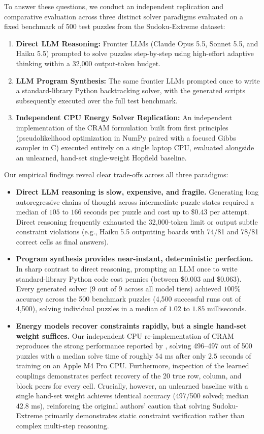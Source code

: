 \documentclass{article} %
\begin{document}
To answer these questions, we conduct an independent replication and comparative evaluation across three distinct solver paradigms evaluated on a fixed benchmark of 500 test puzzles from the Sudoku-Extreme dataset:
\begin{enumerate}
    \item \textbf{Direct LLM Reasoning:} Frontier LLMs (Claude Opus 5.5, Sonnet 5.5, and Haiku 5.5) prompted to solve puzzles step-by-step using high-effort adaptive thinking within a 32,000 output-token budget.
    \item \textbf{LLM Program Synthesis:} The same frontier LLMs prompted once to write a standard-library Python backtracking solver, with the generated scripts subsequently executed over the full test benchmark.
    \item \textbf{Independent CPU Energy Solver Replication:} An independent implementation of the CRAM formulation \citep{Hoover2026ClassicalEnergies} built from first principles (pseudolikelihood optimization in NumPy paired with a focused Gibbs sampler in C) executed entirely on a single laptop CPU, evaluated alongside an unlearned, hand-set single-weight Hopfield baseline.
\end{enumerate}

Our empirical findings reveal clear trade-offs across all three paradigms:
\begin{itemize}
    \item \textbf{Direct LLM reasoning is slow, expensive, and fragile.} Generating long autoregressive chains of thought across intermediate puzzle states required a median of $105$ to $166$ seconds per puzzle and cost up to $\$0.43$ per attempt. Direct reasoning frequently exhausted the 32,000-token limit or output subtle constraint violations (e.g., Haiku 5.5 outputting boards with 74/81 and 78/81 correct cells as final answers).
    \item \textbf{Program synthesis provides near-instant, deterministic perfection.} In sharp contrast to direct reasoning, prompting an LLM once to write standard-library Python code cost pennies (between $\$0.003$ and $\$0.063$). Every generated solver (9 out of 9 across all model tiers) achieved $100\%$ accuracy across the 500 benchmark puzzles (4,500 successful runs out of 4,500), solving individual puzzles in a median of $1.02$ to $1.85$ milliseconds.
    \item \textbf{Energy models recover constraints rapidly, but a single hand-set weight suffices.} Our independent CPU re-implementation of CRAM reproduces the strong performance reported by \citet{Hoover2026ClassicalEnergies}, solving 496–497 out of 500 puzzles with a median solve time of roughly $54$ ms after only $2.5$ seconds of training on an Apple M4 Pro CPU. Furthermore, inspection of the learned couplings demonstrates perfect recovery of the 20 true row, column, and block peers for every cell. Crucially, however, an unlearned baseline with a single hand-set weight achieves identical accuracy (497/500 solved; median $42.8$ ms), reinforcing the original authors' caution that solving Sudoku-Extreme primarily demonstrates static constraint verification rather than complex multi-step reasoning.
\end{itemize}
\end{document}
